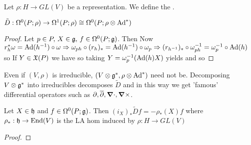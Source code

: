 \documentclass{article}
\begin{document}
\begin{definition}
	Let $\rho: H \to GL(V)$ be a representation. We define 
	the . 
\end{definition}

\begin{prop}
	$\tilde{D} : \Omega^0(P;\rho) \to \Omega^1(P;\rho) \cong \Omega^0(P;\rho \otimes \operatorname{Ad}^\ast)$
\end{prop}
\begin{proof}
	Let $p \in P, \, X \in \mathfrak{g}, \, f \in \Omega^0(P;\mathfrak{g})$. Then 
	Now $r_h^\ast \omega= \operatorname{Ad}(h^{-1}) \circ \omega \Rightarrow \omega_{ph} \circ (r_h)_\ast = \operatorname{Ad}(h^{-1}) \circ \omega_p \Rightarrow (r_{h^{-1}})_\ast \circ \omega_{ph}^{-1} = \omega_p^{-1} \circ \operatorname{Ad}(h)$ so
	If $Y \in \mathfrak{X}(P)$ we have 
	so taking $Y = \omega_p^{-1} (\operatorname{Ad}(h)X)$ yields 
	and so 
\end{proof}
Even if $(V,\rho)$ is irreducible, $(V \otimes \mathfrak{g}^\ast, \rho \otimes \operatorname{Ad}^\ast)$ need not be. Decomposing $V \otimes \mathfrak{g}^\ast$ into irreducibles decomposes $\tilde{D}$ and in this way we get 'famous' differential operators such as $\partial,\overline{\partial}, \bm{\nabla}\cdot, \bm{\nabla}\times$.

\begin{lemma}
	Let $X \in \mathfrak{h} $ and $f \in \Omega^0(P;\mathfrak{g})$. Then $(i_X)_\ast \tilde{D}f = -\rho_\ast(X) f$ where $\rho_\ast : \mathfrak{h} \to \operatorname{End}(V)$ is the LA hom induced by $\rho : H \to GL(V)$
\end{lemma}
\begin{proof}
\end{proof}
\end{document}
